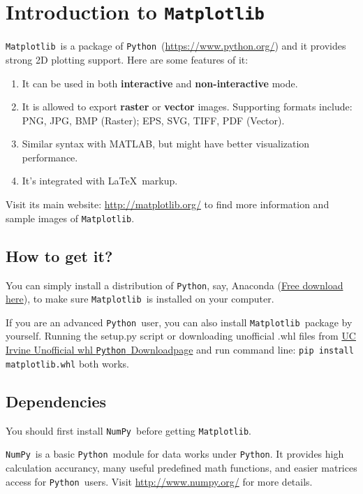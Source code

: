 \documentclass{report}
\newcommand{\pkg}[1]{\texttt{#1}}
\newcommand{\Py}{\pkg{Python}}
\newcommand{\NumPy}{\pkg{NumPy}}
\newcommand{\mpl}{\texttt{Matplotlib}}
\newcommand{\Emph}[1]{\textcolor{cyan!80!white}{{\bfseries #1}}}
\begin{document}
\vfill\clearpage

\tableofcontents

\listoffigures

\chapter{Introduction to \mpl}
\mpl\ is a package of \Py\ (\url{https://www.python.org/}) and it provides strong 2D plotting support. Here are some features of it:
\begin{enumerate}
\item It can be used in both \Emph{interactive} and \Emph{non-interactive} mode.
\item It is allowed to export \Emph{raster} or \Emph{vector} images. Supporting formats include: PNG, JPG, BMP (Raster); EPS, SVG, TIFF, PDF (Vector).
\item Similar syntax with MATLAB, but might have better visualization performance.
\item It's integrated with \LaTeX\ markup.
\end{enumerate}

Visit its main website: \url{http://matplotlib.org/} to find more information and sample images of \mpl . 

\section{How to get it?}
You can simply install a distribution of \Py, say, Anaconda (\href{https://www.continuum.io/downloads}{Free download here}), to make sure \mpl\ is installed on your computer. 

If you are an advanced \Py\ user, you can also install \mpl\ package by yourself. Running the setup.py script or downloading unofficial .whl files from \href{http://www.lfd.uci.edu/~gohlke/pythonlibs/#matplotlib}{UC Irvine Unofficial whl \Py\ Downloadpage} and run command line: \texttt{pip install matplotlib.whl} both works.

\section{Dependencies}
You should first install \NumPy\ before getting \mpl .

\NumPy\ is a basic \Py\ module for data works under \Py . It provides high calculation accurancy, many useful predefined math functions, and easier matrices access for \Py\ users. Visit \url{http://www.numpy.org/} for more details.
\end{document}
